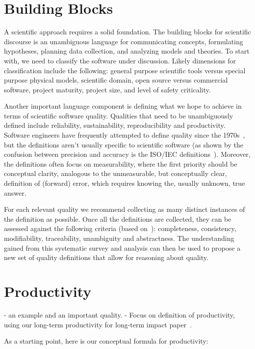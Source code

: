 \documentclass[sigconf, authorversion, nonacm]{acmart}
\begin{document}
\section{Building Blocks}

A scientific approach requires a solid foundation.  The building blocks for
scientific discourse is an unambiguous language for communicating concepts,
formulating hypotheses, planning data collection, and analyzing models and
theories.  To start with, we need to classify the software under discussion.
Likely dimensions for classification include the following: general purpose
scientific tools versus special purpose physical models, scientific domain, open
source versus commercial software, project maturity, project size, and level of
safety criticality.

Another important language component is defining what we hope to achieve in
terms of scientific software quality. Qualities that need to be unambiguously
defined include reliability, sustainability, reproducibility and productivity.
Software engineers have frequently attempted to define quality since the
1970s~\cite{McCallEtAl1977}, but the definitions aren't usually specific to
scientific software (as shown by the confusion between precision and accuracy is
the ISO/IEC definitions~\cite{ISO9126}). Moreover, the definitions often focus
on measurability, where the first priority should be conceptual clarity,
analogous to the unmeasurable, but conceptually clear, definition of (forward)
error, which requires knowing the, usually unknown, true answer.

For each relevant quality we recommend collecting as many distinct instances of
the definition as possible.  Once all the definitions are collected, they can be
assessed against the following criteria (based on~\citet{IEEE1998}):
completeness, consistency, modifiability, traceability, unambiguity and
abstractness. The understanding gained from this systematic survey and analysis
can then be used to propose a new set of quality definitions that allow for
reasoning about quality.

\section{Productivity}

- an example and an important quality. - Focus on definition of productivity,
using our long-term productivity for long-term impact
paper~\cite{SmithAndCarette2020arXiv}. 

As a starting point, here is our conceptual formula for productivity:
\end{document}
